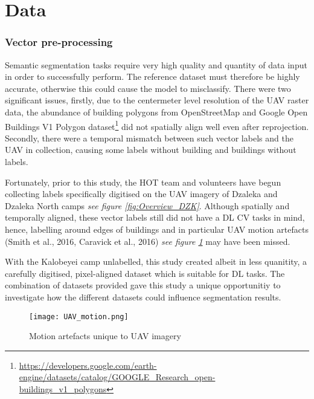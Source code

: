 \documentclass[11pt, a4paper, twoside]{report}
\begin{document}
\section{Data}\label{Data}

\subsubsection{Vector pre-processing}

Semantic segmentation tasks require very high quality and quantity of data input in order to successfully perform. The reference dataset must therefore be highly accurate, otherwise this could cause the model to misclassify. There were two significant issues, firstly, due to the centermeter level resolution of the UAV raster data, the abundance of building polygons from OpenStreetMap and Google Open Buildings V1 Polygon dataset\footnote{\url{https://developers.google.com/earth-engine/datasets/catalog/GOOGLE_Research_open-buildings_v1_polygons}} did not spatially align well even after reprojection. Secondly, there were a temporal mismatch between such vector labels and the UAV in collection, causing some labels without building and buildings without labels.\\\par

Fortunately, prior to this study, the HOT team and volunteers have begun collecting labels specifically digitised on the UAV imagery of Dzaleka and Dzaleka North camps \textit{see figure \ref{fig:Overview_DZK}}. Although spatially and temporally aligned, these vector labels still did not have a DL CV tasks in mind, hence, labelling around edges of buildings and in particular UAV motion artefacts (Smith et al., 2016, Caravick et al., 2016) \textit{see figure \ref{fig:UAV_motion}} may have been missed.\\\par

With the Kalobeyei camp unlabelled, this study created albeit in less quanitity, a carefully digitised, pixel-aligned dataset which is suitable for DL tasks. The combination of datasets provided gave this study a unique opportunitiy to investigate how the different datasets could influence segmentation results.\\\par

\begin{figure}[H]
  \centering
  \texttt{[image: UAV\_motion.png]}
  \caption{Motion artefacts unique to UAV imagery}
  \label{fig:UAV_motion}
\end{figure}
\end{document}
